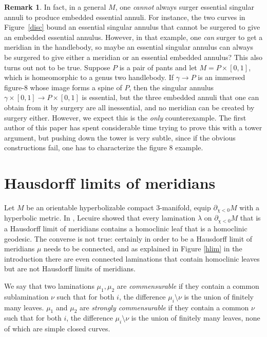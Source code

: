 \documentclass[12pt]{amsart}
\theoremstyle{definition}
\newtheorem{remark}[theorem]{Remark}
\theoremstyle{remark}
\begin{document}
\begin {remark}
In fact, in a general $M$, one \emph{cannot} always surger essential singular annuli to produce embedded essential annuli. For instance, the two curves in Figure~\ref{disc} bound an essential singular annulus that cannot be surgered to give an embedded essential annulus. However, in that example, one \emph{can} surger to get a meridian in the handlebody, so maybe an essential singular annulus can always be surgered to give either a meridian or an essential embedded annulus? This also turns out not to be true. Suppose $P$  is a pair of pants and let $M=P\times [0,1]$, which is homeomorphic to a genus two handlebody. If $\gamma \longrightarrow P$ is an immersed figure-$8$  whose image forms a spine of $P$, then  the singular annulus $\gamma \times [0,1] \longrightarrow P \times [0,1]$  is essential, but the three embedded annuli that one can obtain from it  by surgery are all inessential, and no meridian can be created by surgery either. However,  we expect this is the \emph{only} counterexample. The first author of this paper has spent considerable time trying to prove this with a tower argument,  but pushing  down the tower is very  subtle, since if the obvious constructions  fail, one has to characterize the figure $8$ example.
\end {remark}




\section{Hausdorff limits of meridians}
\label {cassonsec}
Let $M$ be an orientable hyperbolizable compact $3$-manifold, equip $\partial_{\chi<0}M $ with a hyperbolic metric. In \cite[Theorem B.1]{Lecuireplissage}, Lecuire showed that every lamination $\lambda$ on $\partial_{\chi<0}M$ that is a Hausdorff limit of meridians contains a homoclinic leaf that is a homoclinic geodesic. The converse is not true:  certainly in order to be a Hausdorff limit of meridians $\mu$ needs to be connected, and as explained in Figure \ref{hlim} in the introduction there are even connected laminations that contain homoclinic leaves but are not  Hausdorff limits of meridians.



We say that two laminations $\mu_1,\mu_2$ are \emph {commensurable} if they contain a common sublamination $\nu$ such that  for both $i$,  the difference $\mu_i \setminus \nu$  is the union of finitely many leaves.   $\mu_1$ and $\mu_2$ are \emph {strongly commensurable} if they contain a common $\nu$ such that for both $i$, the difference $\mu_i \setminus \nu$  is the union of finitely many leaves, none of which are simple closed curves. 
\end{document}
